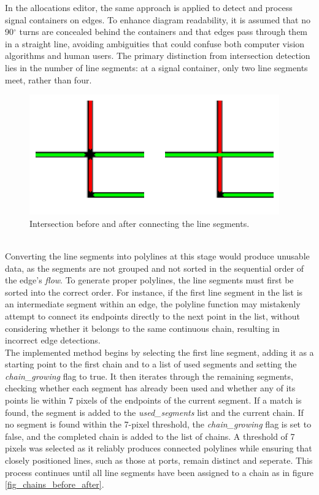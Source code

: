 In the allocations editor, the same approach is applied to detect and process signal containers on edges. To enhance diagram readability, it is assumed that no 90$^{\circ}$ turns are concealed behind the containers and that edges pass through them in a straight line, avoiding ambiguities that could confuse both computer vision algorithms and human users. The primary distinction from intersection detection lies in the number of line segments: at a signal container, only two line segments meet, rather than four.
\begin{figure}[h]
    \centering
    \includegraphics[width=0.7\linewidth]{Pictures/intersection_before_after.png}
    \caption{Intersection before and after connecting the line segments.}
    \label{fig:_intersection_before_after}
\end{figure}\\
Converting the line segments into polylines at this stage would produce unusable data, as the segments are not grouped and not sorted in the sequential order of the edge's \textit{flow}. To generate proper polylines, the line segments must first be sorted into the correct order. For instance, if the first line segment in the list is an intermediate segment within an edge, the polyline function may mistakenly attempt to connect its endpoints directly to the next point in the list, without considering whether it belongs to the same continuous chain, resulting in incorrect edge detections.\\
The implemented method begins by selecting the first line segment, adding it as a starting point to the first chain and to a list of used segments and setting the \textit{chain\_growing} flag to true. It then iterates through the remaining segments, checking whether each segment has already been used and whether any of its points lie within 7 pixels of the endpoints of the current segment. If a match is found, the segment is added to the \textit{used\_segments} list and the current chain. If no segment is found within the 7-pixel threshold, the \textit{chain\_growing} flag is set to false, and the completed chain is added to the list of chains. A threshold of 7 pixels was selected as it reliably produces connected polylines while ensuring that closely positioned lines, such as those at ports, remain distinct and seperate. This process continues until all line segments have been assigned to a chain as in figure \ref{fig_chains_before_after}.
